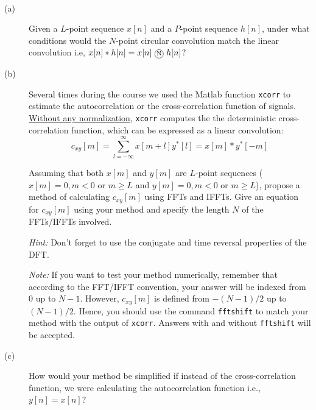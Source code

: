 \documentclass[12pt]{report}
\begin{document}
~~~
 
\newpage
{} 

\begin{description}
	\item [(a)] Given a $L$-point sequence $x[n]$ and a $P$-point sequence $h[n]$, under what conditions would the $N$-point circular convolution match the linear convolution i.e, $x[n] \ast h[n] = x[n]~\encircle{N}~h[n]$?
	
	\item[(b)]  Several times during the course we used the Matlab function \texttt{xcorr} to estimate the autocorrelation or the cross-correlation function of signals. \underline{Without any normalization}, \texttt{xcorr} computes the the deterministic cross-correlation function, which can be expressed as a linear convolution:
	\begin{equation}
		c_{xy}[m] = \sum_{l = -\infty}^{\infty} x[m+l]y^*[l] = x[m]\ast y^*[-m]
	\end{equation}
	
	Assuming that both $x[m]$ and $y[m]$ are $L$-point sequences ($x[m] = 0, m < 0$ or $m \geq L$ and $y[m] = 0, m < 0$ or $m \geq L$), propose a method of calculating $c_{xy}[m]$ using FFTs and IFFTs. Give an equation for $c_{xy}[m]$ using your method and specify the length $N$ of the FFTs/IFFTs involved.
	
	\noindent\textit{Hint:} Don't forget to use the conjugate and time reversal properties of the DFT.
	
	\noindent\textit{Note:} If you want to test your method numerically, remember that according to the FFT/IFFT convention, your answer will be indexed from $0$ up to $N-1$. However, $c_{xy}[m]$ is defined from $-(N-1)/2$ up to $(N-1)/2$. Hence, you should use the command \texttt{fftshift} to match your method with the output of \texttt{xcorr}. Answers with and without \texttt{fftshift} will be accepted.
	
	\item [(c)] How would your method be simplified if instead of the cross-correlation function, we were calculating the autocorrelation function i.e., $y[n] = x[n]$?
\end{description}

\newpage
{} 
\end{document}
